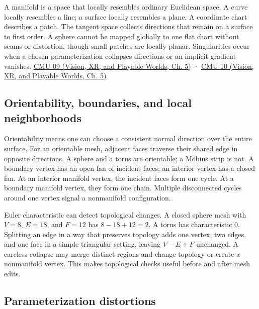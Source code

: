 A manifold is a space that locally resembles ordinary Euclidean space. A curve locally resembles a line; a surface locally resembles a plane. A coordinate chart describes a patch. The tangent space collects directions that remain on a surface to first order. A sphere cannot be mapped globally to one flat chart without seams or distortion, though small patches are locally planar. Singularities occur when a chosen parameterization collapses directions or an implicit gradient vanishes. \href{../07-Vision-XR-and-Playable-Worlds/main.pdf\#nameddest=04-visual-computing-ii-ch036-cmu-09---introduction-to-geometry}{CMU-09 (Vision, XR, and Playable Worlds, Ch. 5)} · \href{../07-Vision-XR-and-Playable-Worlds/main.pdf\#nameddest=04-visual-computing-ii-ch036-cmu-10---meshes-and-manifolds}{CMU-10 (Vision, XR, and Playable Worlds, Ch. 5)}

\subsection{Orientability, boundaries, and local neighborhoods}\label{03-visual-computing-i-ch002-orientability-boundaries-and-local-neighborhoods}

Orientability means one can choose a consistent normal direction over the entire surface. For an orientable mesh, adjacent faces traverse their shared edge in opposite directions. A sphere and a torus are orientable; a Möbius strip is not. A boundary vertex has an open fan of incident faces; an interior vertex has a closed fan. At an interior manifold vertex, the incident faces form one cycle. At a boundary manifold vertex, they form one chain. Multiple disconnected cycles around one vertex signal a nonmanifold configuration.

Euler characteristic can detect topological changes. A closed sphere mesh with \(V=8\), \(E=18\), and \(F=12\) has \(8-18+12=2\). A torus has characteristic 0. Splitting an edge in a way that preserves topology adds one vertex, two edges, and one face in a simple triangular setting, leaving \(V-E+F\) unchanged. A careless collapse may merge distinct regions and change topology or create a nonmanifold vertex. This makes topological checks useful before and after mesh edits.

\subsection{Parameterization distortions}\label{03-visual-computing-i-ch002-parameterization-distortions}


